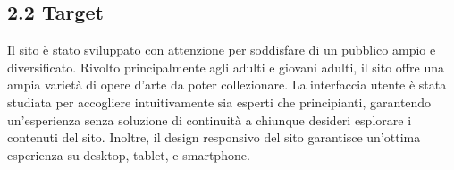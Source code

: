 \documentclass[11pt]{article}
\begin{document}
\subsection{2.2 Target}
\label{sec:org56b0757}
Il sito è stato sviluppato con attenzione per soddisfare di un pubblico ampio e diversificato. Rivolto principalmente agli adulti e giovani adulti, il sito offre una ampia varietà di opere d'arte da poter collezionare. La interfaccia utente è stata studiata per accogliere intuitivamente sia esperti che principianti, garantendo un'esperienza senza soluzione di continuità a chiunque desideri esplorare i contenuti del sito. Inoltre, il design responsivo del sito garantisce un'ottima esperienza su desktop, tablet, e smartphone.
\end{document}

